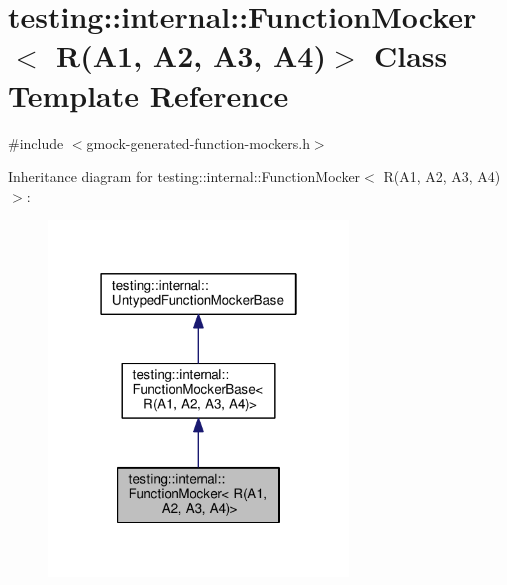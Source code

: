 \hypertarget{classtesting_1_1internal_1_1FunctionMocker_3_01R_07A1_00_01A2_00_01A3_00_01A4_08_4}{}\section{testing\+:\+:internal\+:\+:Function\+Mocker$<$ R(A1, A2, A3, A4)$>$ Class Template Reference}
\label{classtesting_1_1internal_1_1FunctionMocker_3_01R_07A1_00_01A2_00_01A3_00_01A4_08_4}


{\ttfamily \#include $<$gmock-\/generated-\/function-\/mockers.\+h$>$}



Inheritance diagram for testing\+:\+:internal\+:\+:Function\+Mocker$<$ R(A1, A2, A3, A4)$>$\+:\nopagebreak
\begin{figure}[H]
\begin{center}
\leavevmode
\includegraphics[width=226pt]{classtesting_1_1internal_1_1FunctionMocker_3_01R_07A1_00_01A2_00_01A3_00_01A4_08_4__inherit__graph}
\end{center}
\end{figure}


